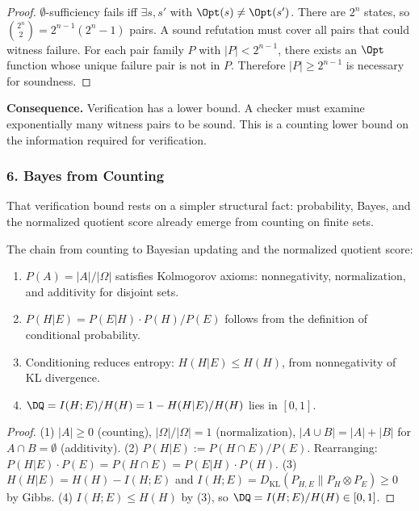 \begin{proof}
$\emptyset$-sufficiency fails iff $\exists s, s'$ with $\Opt(s) \neq \Opt(s')$. There are $2^n$ states, so $\binom{2^n}{2} = 2^{n-1}(2^n - 1)$ pairs. A sound refutation must cover all pairs that could witness failure. For each pair family $P$ with $|P| < 2^{n-1}$, there exists an $\Opt$ function whose unique failure pair is not in $P$. Therefore $|P| \geq 2^{n-1}$ is necessary for soundness.
\end{proof}

\noindent\textbf{Consequence.} Verification has a lower bound. A checker must examine exponentially many witness pairs to be sound. This is a counting lower bound on the information required for verification.

\subsubsection{6. Bayes from Counting}

That verification bound rests on a simpler structural fact: probability, Bayes, and the normalized quotient score already emerge from counting on finite sets.

\begin{theorem}\label{thm:bayes-from-counting}
The chain from counting to Bayesian updating and the normalized quotient score:
\begin{enumerate}
\item $P(A) = |A|/|\Omega|$ satisfies Kolmogorov axioms: nonnegativity, normalization, and additivity for disjoint sets.
\item $P(H|E) = P(E|H) \cdot P(H) / P(E)$ follows from the definition of conditional probability.
\item Conditioning reduces entropy: $H(H|E) \leq H(H)$, from nonnegativity of KL divergence.
\item $\DQ = I(H;E)/H(H) = 1 - H(H|E)/H(H)$ lies in $[0,1]$.
\end{enumerate}
\end{theorem}

\begin{proof}
(1) $|A| \geq 0$ (counting), $|\Omega|/|\Omega| = 1$ (normalization), $|A \cup B| = |A| + |B|$ for $A \cap B = \emptyset$ (additivity).
(2) $P(H|E) := P(H \cap E)/P(E)$. Rearranging: $P(H|E) \cdot P(E) = P(H \cap E) = P(E|H) \cdot P(H)$.
(3) $H(H|E) = H(H) - I(H;E)$ and $I(H;E) = D_{\mathrm{KL}}(P_{H,E} \| P_H \otimes P_E) \geq 0$ by Gibbs.
(4) $I(H;E) \leq H(H)$ by (3), so $\DQ = I(H;E)/H(H) \in [0,1]$.
\end{proof}

